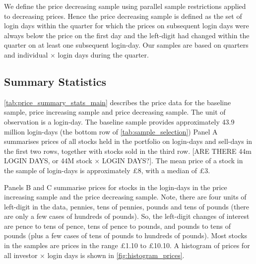 We define the price decreasing sample using parallel sample restrictions applied to decreasing prices. Hence the price decreasing sample is defined as the set of login days within the quarter for which the prices on subsequent login days were always below the price on the first day and the left-digit had changed within the quarter on at least one subsequent login-day. Our samples are based on quarters and individual $\times$  login days during the quarter. 

\subsection{Summary Statistics}

\ref{tab:price_summary_stats_main} describes the price data for the baseline sample, price increasing sample and price decreasing sample. The unit of observation is a login-day. The baseline sample provides approximately 43.9 million login-days (the bottom row of \ref{tab:sample_selection}) Panel A summarises prices of all stocks held in the portfolio on login-days and sell-days in the first two rows, together with stocks sold in the third row. [ARE THERE 44m LOGIN DAYS, or 44M stock $\times$ LOGIN DAYS?]. The mean price of a stock in the sample of login-days is approximately \pounds8, with a median of \pounds3. 

Panels B and C summarise prices for stocks in the login-days in the price increasing sample and the price decreasing sample. Note, there are four units of left-digit in the data, pennies, tens of pennies, pounds and tens of pounds (there are only a few cases of hundreds of pounds). So, the left-digit changes of interest are pence to tens of pence, tens of pence to pounds, and pounds to tens of pounds (plus a few cases of tens of pounds to hundreds of pounds). Most stocks in the samples are prices in the range \pounds1.10 to \pounds10.10. A histogram of prices for all investor $\times$ login days is shown in \ref{fig:histogram_prices}.


